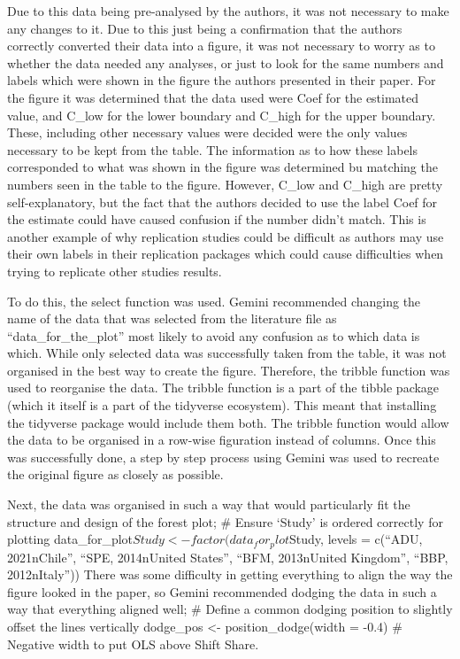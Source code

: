 \documentclass[
  man,
  floatsintext,
  longtable,
  nolmodern,
  notxfonts,
  notimes,
  colorlinks=true,linkcolor=blue,citecolor=blue,urlcolor=blue]{apa7}
\begin{document}
Due to this data being pre-analysed by the authors, it was not necessary
to make any changes to it. Due to this just being a confirmation that
the authors correctly converted their data into a figure, it was not
necessary to worry as to whether the data needed any analyses, or just
to look for the same numbers and labels which were shown in the figure
the authors presented in their paper. For the figure it was determined
that the data used were Coef for the estimated value, and C\_low for the
lower boundary and C\_high for the upper boundary. These, including
other necessary values were decided were the only values necessary to be
kept from the table. The information as to how these labels corresponded
to what was shown in the figure was determined bu matching the numbers
seen in the table to the figure. However, C\_low and C\_high are pretty
self-explanatory, but the fact that the authors decided to use the label
Coef for the estimate could have caused confusion if the number didn't
match. This is another example of why replication studies could be
difficult as authors may use their own labels in their replication
packages which could cause difficulties when trying to replicate other
studies results.

To do this, the select function was used. Gemini recommended changing
the name of the data that was selected from the literature file as
``data\_for\_the\_plot'' most likely to avoid any confusion as to which
data is which. While only selected data was successfully taken from the
table, it was not organised in the best way to create the figure.
Therefore, the tribble function was used to reorganise the data. The
tribble function is a part of the tibble package (which it itself is a
part of the tidyverse ecosystem). This meant that installing the
tidyverse package would include them both. The tribble function would
allow the data to be organised in a row-wise figuration instead of
columns. Once this was successfully done, a step by step process using
Gemini was used to recreate the original figure as closely as possible.

Next, the data was organised in such a way that would particularly fit
the structure and design of the forest plot; \# Ensure `Study' is
ordered correctly for plotting
data\_for\_plot\(Study <- factor(data_for_plot\)Study, levels = c(``ADU,
2021nChile'', ``SPE, 2014nUnited States'', ``BFM, 2013nUnited Kingdom'',
``BBP, 2012nItaly'')) There was some difficulty in getting everything to
align the way the figure looked in the paper, so Gemini recommended
dodging the data in such a way that everything aligned well; \# Define a
common dodging position to slightly offset the lines vertically
dodge\_pos \textless- position\_dodge(width = -0.4) \# Negative width to
put OLS above Shift Share.
\end{document}
